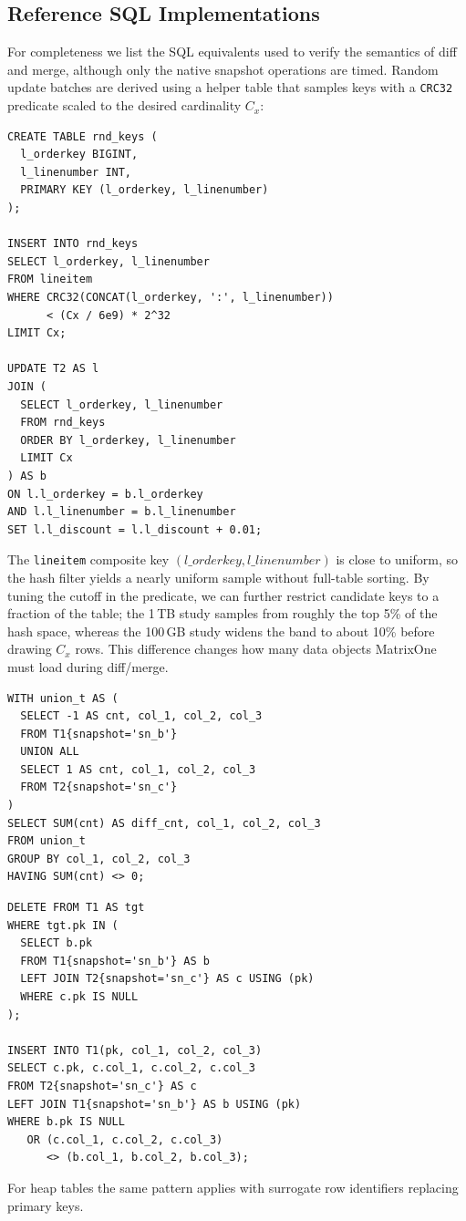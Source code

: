 \documentclass[sigconf,nonacm]{acmart} %
\begin{document}
\subsection{Reference SQL Implementations}
For completeness we list the SQL equivalents used to verify the
semantics of diff and merge, although only the native snapshot
operations are timed.  Random update batches are derived using a helper
table that samples keys with a \texttt{CRC32} predicate scaled to the
desired cardinality $C_x$:
\begin{lstlisting}[label=lst:random-keys,caption=Sampling Keys for Update Batches]
CREATE TABLE rnd_keys (
  l_orderkey BIGINT,
  l_linenumber INT,
  PRIMARY KEY (l_orderkey, l_linenumber)
);

INSERT INTO rnd_keys
SELECT l_orderkey, l_linenumber
FROM lineitem
WHERE CRC32(CONCAT(l_orderkey, ':', l_linenumber))
      < (Cx / 6e9) * 2^32
LIMIT Cx;

UPDATE T2 AS l
JOIN (
  SELECT l_orderkey, l_linenumber
  FROM rnd_keys
  ORDER BY l_orderkey, l_linenumber
  LIMIT Cx
) AS b
ON l.l_orderkey = b.l_orderkey
AND l.l_linenumber = b.l_linenumber
SET l.l_discount = l.l_discount + 0.01;
\end{lstlisting}
The \texttt{lineitem} composite key $(l\_orderkey,l\_linenumber)$ is
close to uniform, so the hash filter yields a nearly uniform sample
without full-table sorting.
By tuning the cutoff in the predicate, we can further restrict candidate
keys to a fraction of the table; the 1\,TB study samples from roughly
the top 5\% of the hash space, whereas the 100\,GB study widens the band
to about 10\% before drawing $C_x$ rows.  This difference changes how
many data objects MatrixOne must load during diff/merge.
\begin{lstlisting}[label=lst:diff-sql,caption=SQL Reference for Diff]
WITH union_t AS (
  SELECT -1 AS cnt, col_1, col_2, col_3
  FROM T1{snapshot='sn_b'}
  UNION ALL
  SELECT 1 AS cnt, col_1, col_2, col_3
  FROM T2{snapshot='sn_c'}
)
SELECT SUM(cnt) AS diff_cnt, col_1, col_2, col_3
FROM union_t
GROUP BY col_1, col_2, col_3
HAVING SUM(cnt) <> 0;
\end{lstlisting}
\begin{lstlisting}[label=lst:merge-sql,caption=SQL Reference for Merge]
DELETE FROM T1 AS tgt
WHERE tgt.pk IN (
  SELECT b.pk
  FROM T1{snapshot='sn_b'} AS b
  LEFT JOIN T2{snapshot='sn_c'} AS c USING (pk)
  WHERE c.pk IS NULL
);

INSERT INTO T1(pk, col_1, col_2, col_3)
SELECT c.pk, c.col_1, c.col_2, c.col_3
FROM T2{snapshot='sn_c'} AS c
LEFT JOIN T1{snapshot='sn_b'} AS b USING (pk)
WHERE b.pk IS NULL
   OR (c.col_1, c.col_2, c.col_3)
      <> (b.col_1, b.col_2, b.col_3);
\end{lstlisting}
For heap tables the same pattern applies with surrogate row identifiers
replacing primary keys.
\end{document}
